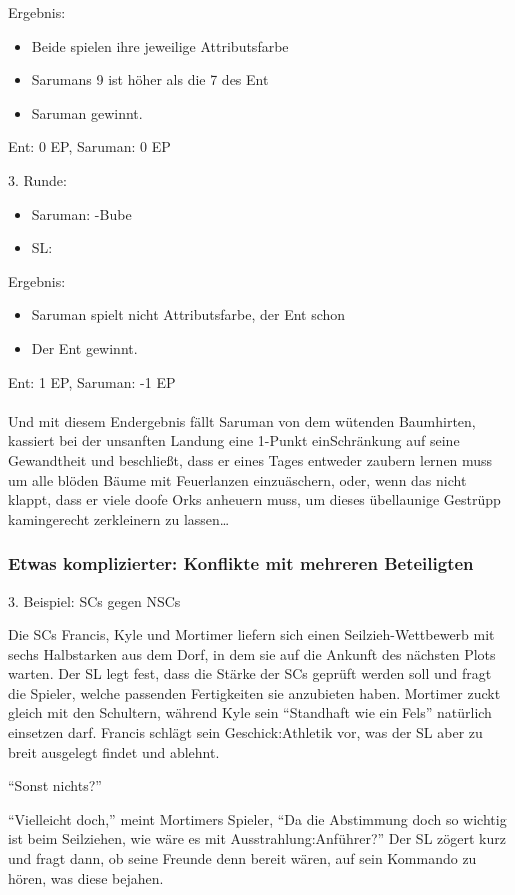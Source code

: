 Ergebnis:
\begin {itemize}
\item Beide spielen ihre jeweilige Attributsfarbe
\item Sarumans 9 ist höher als die 7 des Ent
\item Saruman gewinnt.
\end {itemize}
Ent: 0 EP, Saruman: 0 EP

3. Runde:
\begin {itemize}
\item Saruman: \karo-Bube
\item SL: 
\end {itemize}

Ergebnis:
\begin {itemize}
\item Saruman spielt nicht Attributsfarbe, der Ent schon
\item Der Ent gewinnt.
\end {itemize}
Ent: 1 EP, Saruman: -1 EP
\\
\\
Und mit diesem Endergebnis fällt Saruman von dem wütenden Baumhirten, kassiert bei der unsanften Landung eine 1-Punkt einSchränkung auf seine Gewandtheit und beschließt, dass er eines Tages entweder zaubern lernen muss um alle blöden Bäume mit Feuerlanzen einzuäschern, oder, wenn das nicht klappt, dass er viele doofe Orks anheuern muss, um dieses übellaunige Gestrüpp kamingerecht zerkleinern zu lassen\dots

\subsubsection {Etwas komplizierter: Konflikte mit mehreren Beteiligten}

3. Beispiel: SCs gegen NSCs

Die SCs Francis, Kyle und Mortimer liefern sich einen Seilzieh-Wettbewerb mit sechs Halbstarken aus dem Dorf, in dem sie auf die Ankunft des nächsten Plots warten. Der SL legt fest, dass die Stärke der SCs geprüft werden soll und fragt die Spieler, welche passenden Fertigkeiten sie anzubieten haben. Mortimer zuckt gleich mit den Schultern, während Kyle sein "`Standhaft wie ein Fels"' natürlich einsetzen darf. Francis schlägt sein Geschick:Athletik vor, was der SL aber zu breit ausgelegt findet und ablehnt.

"`Sonst nichts?"'

"`Vielleicht doch,"' meint Mortimers Spieler, "`Da die Abstimmung doch so wichtig ist beim Seilziehen, wie wäre es mit Ausstrahlung:Anführer?"'
Der SL zögert kurz und fragt dann, ob seine Freunde denn bereit wären, auf sein Kommando zu hören, was diese bejahen.

